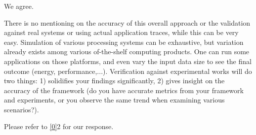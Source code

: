 \begin{authors}
We agree.

\begin{actions}
\end{actions}
\end{authors}

\begin{reviewer}
There is no mentioning on the accuracy of this overall approach or the
validation against real systems or using actual application traces, while this
can be very easy. Simulation of various processing systems can be exhaustive,
but variation already exists among various of-the-shelf computing products. One
can run some applications on those platforms, and even vary the input data size
to see the final outcome (energy, performance,...). Verification against
experimental works will do two things: 1) solidifies your findings
significantly, 2) gives insight on the accuracy of the framework (do you have
accurate metrics from your framework and experiments, or you observe the same
trend when examining various scenarios?).
\end{reviewer}

\begin{authors}
Please refer to \cref{0}{2} for our response.

\begin{actions}
\end{actions}
\end{authors}
